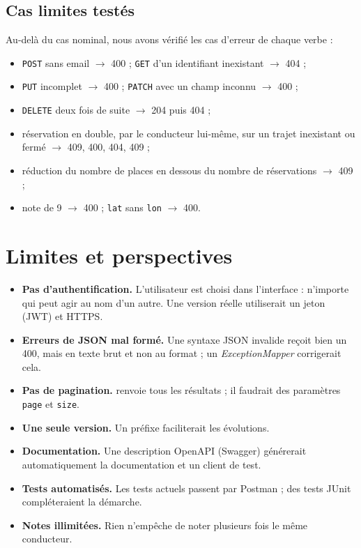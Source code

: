 \documentclass[11pt,a4paper]{article}
\newcommand{\cle}[1]{\texttt{\detokenize{#1}}}
\begin{document}
\subsection{Cas limites test\'es}
Au-del\`a du cas nominal, nous avons v\'erifi\'e les cas d'erreur de chaque verbe :
\begin{itemize}
  \item \texttt{POST} sans email $\rightarrow$ 400 ; \texttt{GET} d'un identifiant inexistant $\rightarrow$ 404 ;
  \item \texttt{PUT} incomplet $\rightarrow$ 400 ; \texttt{PATCH} avec un champ inconnu $\rightarrow$ 400 ;
  \item \texttt{DELETE} deux fois de suite $\rightarrow$ 204 puis 404 ;
  \item r\'eservation en double, par le conducteur lui-m\^eme, sur un trajet inexistant ou ferm\'e $\rightarrow$ 409, 400, 404, 409 ;
  \item r\'eduction du nombre de places en dessous du nombre de r\'eservations $\rightarrow$ 409 ;
  \item note de 9 $\rightarrow$ 400 ; \texttt{lat} sans \texttt{lon} $\rightarrow$ 400.
\end{itemize}

\section{Limites et perspectives}
\begin{itemize}
  \item \textbf{Pas d'authentification.} L'utilisateur est choisi dans l'interface : n'importe qui peut agir au nom d'un autre. Une version r\'eelle utiliserait un jeton (JWT) et HTTPS.
  \item \textbf{Erreurs de JSON mal form\'e.} Une syntaxe JSON invalide re\c coit bien un 400, mais en texte brut et non au format \cle{{"error": ...}} ; un \emph{ExceptionMapper} corrigerait cela.
  \item \textbf{Pas de pagination.} \cle{GET /rides} renvoie tous les r\'esultats ; il faudrait des param\`etres \texttt{page} et \texttt{size}.
  \item \textbf{Une seule version.} Un pr\'efixe \cle{/api/v1} faciliterait les \'evolutions.
  \item \textbf{Documentation.} Une description OpenAPI (Swagger) g\'en\'ererait automatiquement la documentation et un client de test.
  \item \textbf{Tests automatis\'es.} Les tests actuels passent par Postman ; des tests JUnit compl\'eteraient la d\'emarche.
  \item \textbf{Notes illimit\'ees.} Rien n'emp\^eche de noter plusieurs fois le m\^eme conducteur.
\end{itemize}
\end{document}
